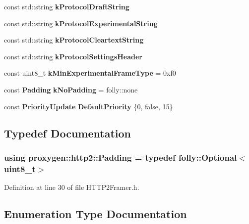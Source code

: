 \begin{DoxyCompactItemize}
const std\+::string {\bf k\+Protocol\+Draft\+String}
\item 
const std\+::string {\bf k\+Protocol\+Experimental\+String}
\item 
const std\+::string {\bf k\+Protocol\+Cleartext\+String}
\item 
const std\+::string {\bf k\+Protocol\+Settings\+Header}
\item 
const uint8\+\_\+t {\bf k\+Min\+Experimental\+Frame\+Type} = 0xf0
\item 
const {\bf Padding} {\bf k\+No\+Padding} = folly\+::none
\item 
const {\bf Priority\+Update} {\bf Default\+Priority} \{0, false, 15\}
\end{DoxyCompactItemize}


\subsection{Typedef Documentation}
\subsubsection[{Padding}]{\setlength{\rightskip}{0pt plus 5cm}using {\bf proxygen\+::http2\+::\+Padding} = typedef folly\+::\+Optional$<$uint8\+\_\+t$>$}\label{namespaceproxygen_1_1http2_adb27a3f88dc81d4ddede65c1b6a07ce4}


Definition at line 30 of file H\+T\+T\+P2\+Framer.\+h.



\subsection{Enumeration Type Documentation}
